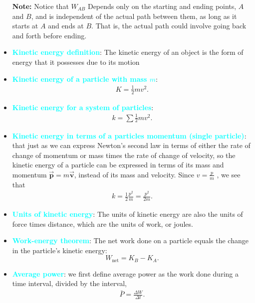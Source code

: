 \documentclass{report}
\begin{document}
\begin{itemize}
     \textbf{Note:} Notice that $W_{AB}$ Depends only on the starting and ending points, $A$ and $B$, and is independent of the actual path between them, as long as it starts at $A$ and ends at $B$. That is, the actual path could involve going back and forth before ending.
    \item \textbf{\textcolor{cyan}{Kinetic energy definition}}: The kinetic energy of an object is the form of energy that it possesses due to its motion
 \item \textbf{\textcolor{cyan}{Kinetic energy of a particle with mass $m$}}:
     \begin{align*}
            K = \frac{1}{2}mv^{2}         
     .\end{align*}
  \item \textbf{\textcolor{cyan}{Kinetic energy for a system of particles}}:
      \begin{align*}
          k = \sum\frac{1}{2}mv^{2}
      .\end{align*}
    \item \textbf{\textcolor{cyan}{Kinetic energy in terms of a particles momentum (single particle)}}:
        that just as we can express Newton’s second law in terms of either the rate of change of momentum or mass times the rate of change of velocity, so the kinetic energy of a particle can be expressed in terms of its mass and momentum  $\vec{\mathbf{p}} = m\vec{\mathbf{v}}$, instead of its mass and velocity. Since $v=\frac{p}{m}$ , we see that
        \begin{align*}
            k = \frac{1}{2}\frac{p^{2}}{m} = \frac{p^{2}}{2m}
        .\end{align*}
    \item \textbf{\textcolor{cyan}{Units of kinetic energy}}: The units of kinetic energy are also the units of force times distance, which are the units of work, or joules.
    \item \textbf{\textcolor{cyan}{Work-energy theorem}}:
        The net work done on a particle equals the change in the particle's kinetic energy:
        \begin{equation}
            W_{\text{net}} = K_B - K_A.
        \end{equation}
    \item \textbf{\textcolor{cyan}{Average power}}: we first define average power as the work done during a time interval, divided by the interval,
        \begin{align*}
            \bar{P} = \frac{\Delta W}{\Delta t}
        .\end{align*}

\end{itemize}
\end{document}
